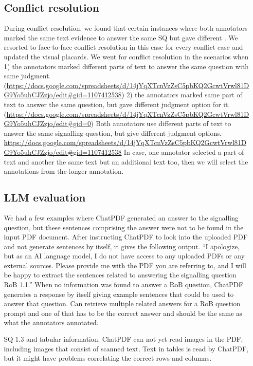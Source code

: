 \documentclass[sn-mathphys,Numbered]{sn-jnl}%
\theoremstyle{thmstyleone}%
\theoremstyle{thmstyletwo}%
\theoremstyle{thmstylethree}%
\begin{document}
%
%
%
\subsection{Conflict resolution}
%
During conflict resolution, we found that certain instances where both annotators marked the same text evidence to answer the same SQ but gave different .
We resorted to face-to-face conflict resolution in this case for every conflict case and updated the visual placards.
We went for conflict resolution in the scenarios when
1) the annotators marked different parts of text to answer the same question with same judgment. (\url{https://docs.google.com/spreadsheets/d/14jYqXTcnVzZsC5pbKQ2GcwtVrwl81DG9Yo5uhCJZzjo/edit#gid=1107412538})
2) the annotators marked same part of text to answer the same question, but gave different judgment option for it. (\url{https://docs.google.com/spreadsheets/d/14jYqXTcnVzZsC5pbKQ2GcwtVrwl81DG9Yo5uhCJZzjo/edit#gid=0})
Both annotators use different parts of text to answer the same signalling question, but give different judgment options. \url{https://docs.google.com/spreadsheets/d/14jYqXTcnVzZsC5pbKQ2GcwtVrwl81DG9Yo5uhCJZzjo/edit#gid=1107412538}
In case, one annotator selected a part of text and another the same text but an additional text too, then we will select the annotations from the longer annotation.
%
%
%
\subsection{LLM evaluation}
\label{disc:llm}
%
We had a few examples where ChatPDF generated an answer to the signalling question, but these sentences comprising the answer were not to be found in the input PDF document.
After instructing ChatPDF to look into the uploaded PDF and not generate sentences by itself, it gives the following output.
``I apologize, but as an AI language model, I do not have access to any uploaded PDFs or any external sources. Please provide me with the PDF you are referring to, and I will be happy to extract the sentences related to answering the signalling question RoB 1.1.''
When no information was found to answer a RoB question, ChatPDF generates a response by itself giving example sentences that could be used to answer that question.
Can retrieve multiple related answers for a RoB question prompt and one of that has to be the correct answer and should be the same as what the annotators annotated.

SQ 1.3 and tabular information.
ChatPDF can not yet read images in the PDF, including images that consist of scanned text. Text in tables is read by ChatPDF, but it might have problems correlating the correct rows and columns.
\end{document}

